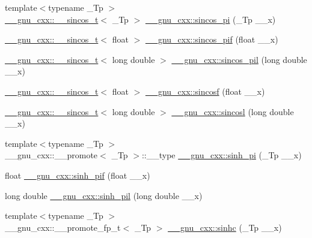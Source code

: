 \begin{DoxyCompactItemize}
\item 
{\footnotesize template$<$typename \+\_\+\+Tp $>$ }\\\hyperlink{struct____gnu__cxx_1_1____sincos__t}{\+\_\+\+\_\+gnu\+\_\+cxx\+::\+\_\+\+\_\+sincos\+\_\+t}$<$ \+\_\+\+Tp $>$ \hyperlink{group__gnu__math__spec__func_ga3152cfc9d5fa04fbe61781b45b3d4c04}{\+\_\+\+\_\+gnu\+\_\+cxx\+::sincos\+\_\+pi} (\+\_\+\+Tp \+\_\+\+\_\+x)
\item 
\hyperlink{struct____gnu__cxx_1_1____sincos__t}{\+\_\+\+\_\+gnu\+\_\+cxx\+::\+\_\+\+\_\+sincos\+\_\+t}$<$ float $>$ \hyperlink{group__gnu__math__spec__func_gacf416c867a8a456f8f0e3d8b45ca8bd5}{\+\_\+\+\_\+gnu\+\_\+cxx\+::sincos\+\_\+pif} (float \+\_\+\+\_\+x)
\item 
\hyperlink{struct____gnu__cxx_1_1____sincos__t}{\+\_\+\+\_\+gnu\+\_\+cxx\+::\+\_\+\+\_\+sincos\+\_\+t}$<$ long double $>$ \hyperlink{group__gnu__math__spec__func_ga1f1efc07313a3de1e994d89c3b83b957}{\+\_\+\+\_\+gnu\+\_\+cxx\+::sincos\+\_\+pil} (long double \+\_\+\+\_\+x)
\item 
\hyperlink{struct____gnu__cxx_1_1____sincos__t}{\+\_\+\+\_\+gnu\+\_\+cxx\+::\+\_\+\+\_\+sincos\+\_\+t}$<$ float $>$ \hyperlink{group__gnu__math__spec__func_ga3929d13e38535418cd24db5cee80660c}{\+\_\+\+\_\+gnu\+\_\+cxx\+::sincosf} (float \+\_\+\+\_\+x)
\item 
\hyperlink{struct____gnu__cxx_1_1____sincos__t}{\+\_\+\+\_\+gnu\+\_\+cxx\+::\+\_\+\+\_\+sincos\+\_\+t}$<$ long double $>$ \hyperlink{group__gnu__math__spec__func_ga96a7222e47d430a228973658ca9f6f35}{\+\_\+\+\_\+gnu\+\_\+cxx\+::sincosl} (long double \+\_\+\+\_\+x)
\item 
{\footnotesize template$<$typename \+\_\+\+Tp $>$ }\\\+\_\+\+\_\+gnu\+\_\+cxx\+::\+\_\+\+\_\+promote$<$ \+\_\+\+Tp $>$\+::\+\_\+\+\_\+type \hyperlink{group__gnu__math__spec__func_gaaad53f580876c2dbc7e0e7a45b937990}{\+\_\+\+\_\+gnu\+\_\+cxx\+::sinh\+\_\+pi} (\+\_\+\+Tp \+\_\+\+\_\+x)
\item 
float \hyperlink{group__gnu__math__spec__func_ga74103f57ab0d97126732f3cb276c5ab3}{\+\_\+\+\_\+gnu\+\_\+cxx\+::sinh\+\_\+pif} (float \+\_\+\+\_\+x)
\item 
long double \hyperlink{group__gnu__math__spec__func_ga2232ee554ef2a902824db42e2e09c483}{\+\_\+\+\_\+gnu\+\_\+cxx\+::sinh\+\_\+pil} (long double \+\_\+\+\_\+x)
\item 
{\footnotesize template$<$typename \+\_\+\+Tp $>$ }\\\+\_\+\+\_\+gnu\+\_\+cxx\+::\+\_\+\+\_\+promote\+\_\+fp\+\_\+t$<$ \+\_\+\+Tp $>$ \hyperlink{group__gnu__math__spec__func_gabafa26d8a2e592a0e080beae71ccbb7e}{\+\_\+\+\_\+gnu\+\_\+cxx\+::sinhc} (\+\_\+\+Tp \+\_\+\+\_\+x)

\end{DoxyCompactItemize}
